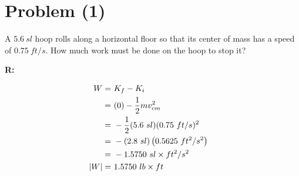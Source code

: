 \section{Problem (1)}
	A $5.6 \ sl$ hoop rolls along a horizontal floor so that its center of mass has a speed of $0.75 \ ft/s$. How much work must be done on the hoop to stop it?

	\textbf{R:}

	\begin{align}
		W = \ &K_{f} - K_{i}& \notag \\
		= \ &(0) - \frac{1}{2}mv_{cm}^{2}& \notag \\
		= \ &- \frac{1}{2}(5.6 \ sl)(0.75 \ ft/s)^{2}& \notag \\
		= \ &- (2.8 \ sl)\left(0.5625 \ ft^{2}/s^{2}\right)& \notag \\
		= \ &- 1.5750 \ sl \times ft^{2}/s^{2}& \notag \\
		|W| = \ &1.5750 \ lb \times ft&
	\end{align}
